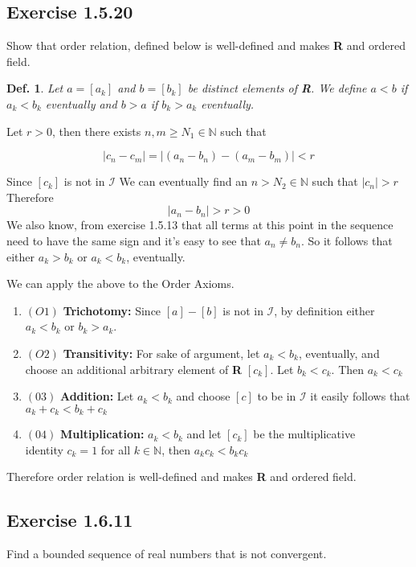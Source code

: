 \documentclass{tufte-book}
\theoremstyle{mytheoremstyle}
\theoremstyle{mylemstyle}
\theoremstyle{mydefstyle}
\newtheorem*{mydef}{Def.}
\begin{document}
\subsection{Exercise 1.5.20}
Show that order relation, defined below is well-defined and makes \textbf{R} and ordered field. 

\begin{mydef}Let $a = [a_k]$ and $b=[b_k]$ be distinct elements of \textbf{R}. We define $a<b$ if $a_k < b_k$ eventually and $b>a$ if $b_k > a_k$ eventually.
\end{mydef}

Let $r > 0$, then there exists $n,m \geq N_1 \in \mathbb{N}$ such that

\[|c_n - c_m| = |(a_n-b_n) - (a_m-b_m)| < r\]

Since $[c_k]$ is not in $\mathcal{I}$ We can eventually find an $n > N_2 \in \mathbb{N}$ such that $|c_n| > r$ Therefore
\[|a_n-b_n| > r > 0\]  We also know, from exercise 1.5.13 that all terms at this point in the sequence need to have the same sign and it's easy to see that $a_n \neq b_n$.  So it follows that either $a_k > b_k$ or $a_k < b_k$, eventually.

We can apply the above to the Order Axioms.
\begin{enumerate}
\item $(O1)$ \textbf{Trichotomy:}  Since $[a] - [b]$ is not in $\mathcal{I}$, by definition either $a_k < b_k$ or $b_k > a_k$.

\item $(O2)$ \textbf{Transitivity:} For sake of argument, let $a_k < b_k$, eventually, and choose an additional arbitrary element of \textbf{R} $[c_k]$. Let $b_k < c_k$. Then $a_k < c_k$

\item $(03)$ \textbf{Addition:} Let $a_k < b_k$ and choose $[c]$ to be in $\mathcal{I}$ it easily follows that $a_k + c_k < b_k + c_k$

\item $(04)$ \textbf{Multiplication:} $a_k < b_k$ and let $[c_k]$ be the multiplicative\\ identity $c_k=1$ for all $k \in \mathbb{N}$, then $a_kc_k<b_kc_k$
\end{enumerate}

Therefore order relation is well-defined and makes \textbf{R} and ordered field.

\subsection{Exercise 1.6.11}
Find a bounded sequence of real numbers that is not convergent.
\end{document}
